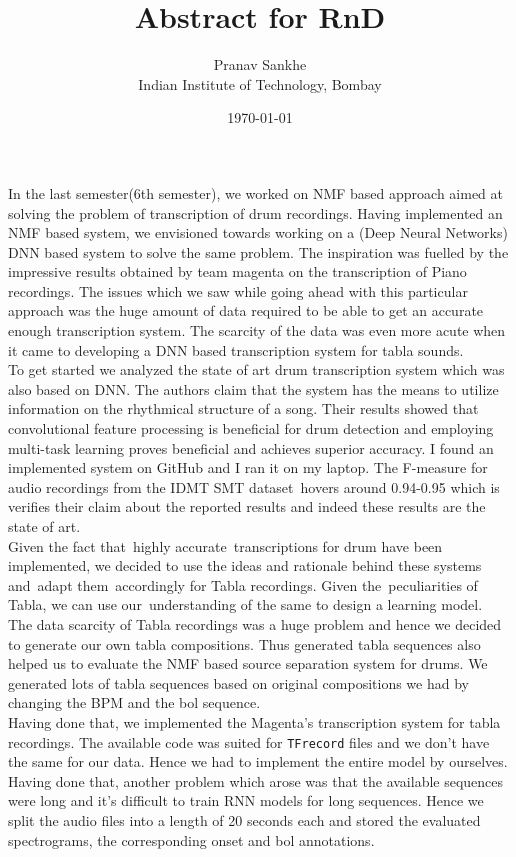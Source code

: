 \documentclass[a4paper]{article}
\title{Abstract for RnD}
\author{Pranav Sankhe \\ Indian Institute of Technology, Bombay}
\date{\today}
\begin{document}
\maketitle


\abstract{}
In the last semester(6th semester), we worked on NMF based approach aimed at solving the problem of transcription of drum recordings. Having implemented an NMF based system, we envisioned towards working on a (Deep Neural Networks) DNN based system to solve the same problem. The inspiration was fuelled by the impressive results obtained by team magenta on the transcription of Piano recordings. The issues which we saw while going ahead with this particular approach was the huge amount of data required to be able to get an accurate enough transcription system. The scarcity of the data was even more acute when it came to developing a DNN based transcription system for tabla sounds. \\ 

To get started we analyzed the state of art drum transcription system which was also based on DNN. The authors claim that the system has the means to utilize information on the rhythmical structure of a song. Their results showed that convolutional feature processing is beneficial for drum detection and employing multi-task learning proves beneficial and achieves superior accuracy. I found an implemented system on GitHub and I ran it on my laptop. The F-measure for audio recordings from the IDMT SMT dataset hovers around 0.94-0.95 which is verifies their claim about the reported results and indeed these results are the state of art. \\

Given the fact that highly accurate transcriptions for drum have been implemented, we decided to use the ideas and rationale behind these systems and adapt them accordingly for Tabla recordings. Given the peculiarities of Tabla, we can use our understanding of the same to design a learning model. \\ 

The data scarcity of Tabla recordings was a huge problem and hence we decided to generate our own tabla compositions. Thus generated tabla sequences also helped us to evaluate the NMF based source separation system for drums. We generated lots of tabla sequences based on original compositions we had by changing the BPM and the bol sequence. \\

Having done that, we implemented the Magenta's transcription system for tabla recordings. The available code was suited for \texttt{TFrecord} files and we don't have the same for our data. Hence we had to implement the entire model by ourselves. Having done that, another problem which arose was that the available sequences were long and it's difficult to train RNN models for long sequences. Hence we split the audio files into a length of 20 seconds each and stored the evaluated spectrograms, the corresponding onset and bol annotations. \\ 
\end{document}
